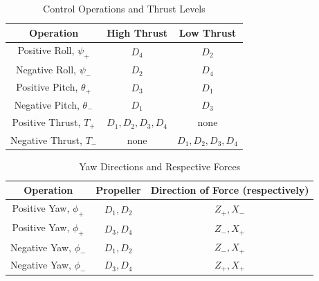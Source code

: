 \documentclass[12pt]{article}
\begin{document}
\begin{table}[ht]
    \begin{center}
    \begin{tabular}{| c | c | c |} 
    \hline
    Operation & High Thrust & Low Thrust \\ 
    \hline
    Positive Roll, $\psi_+$ & $D_4$ & $D_2$ \\
    \hline
    Negative Roll, $\psi_-$ & $D_2$ & $D_4$ \\
    \hline
    Positive Pitch, $\theta_+$ & $D_3$ & $D_1$ \\
    \hline
    Negative Pitch, $\theta_-$ & $D_1$ & $D_3$ \\
    \hline
    Positive Thrust, $T_+$ & $D_1, D_2, D_3, D_4$ & none \\
    \hline
    Negative Thrust, $T_-$ & none & $D_1, D_2, D_3, D_4$ \\
    \hline
    \end{tabular}
    \end{center}
    \caption{Control Operations and Thrust Levels}
    \label{tab:control}
\end{table}

\begin{table}[ht]
    \begin{center}
    \begin{tabular}{| c | c | c |} 
    \hline
    Operation & Propeller & Direction of Force (respectively) \\ 
    \hline
    Positive Yaw, $\phi_+$ & $D_1, D_2$ & $Z_+, X_-$ \\
    \hline
    Positive Yaw, $\phi_+$ & $D_3, D_4$ & $Z_-, X_+$ \\
    \hline
    Negative Yaw, $\phi_-$ & $D_1, D_2$ & $Z_-, X_+$ \\
    \hline
    Negative Yaw, $\phi_-$ & $D_3, D_4$ & $Z_+, X_+$ \\
    \hline
    \end{tabular}
    \end{center}
    \caption{Yaw Directions and Respective Forces}
    \label{tab:yaw-control}
\end{table}
\end{document}
